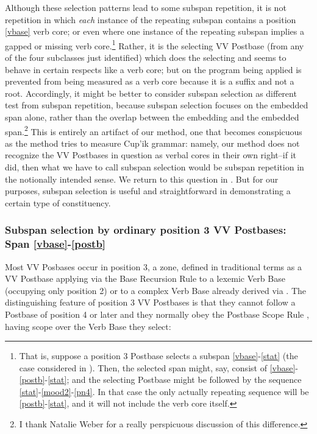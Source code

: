 \documentclass[output=paper]{langscibook}
\begin{document}
Although these selection patterns lead to some subspan repetition, it is not repetition in which \textit{each} instance of the repeating subspan contains a position \ref{vbase} verb core; or even where one instance of the repeating subspan implies a gapped or missing verb core.\footnote{That is, suppose a position 3 Postbase selects a subspan \ref{vbase}-\ref{stat} (the case considered in ). Then, the selected span might, say, consist of \ref{vbase}-\ref{postb}-\ref{stat}; and the selecting Postbase might be followed by the sequence \ref{stat}-\ref{mood2}-\ref{pn4}. In that case the only actually repeating sequence will be \ref{postb}-\ref{stat}, and it will not include the verb core itself.}  Rather, it is the selecting VV Postbase (from any of the four subclasses just identified) which does the selecting and seems to behave in certain respects like a verb core; but on the program being applied is prevented from being measured as a verb core because it is a suffix and not a root. Accordingly, it might be better to consider subspan selection as different test from subspan repetition, because subspan selection focuses on the embedded span alone, rather than the overlap between the embedding and the embedded span.\footnote{I thank Natalie Weber for a really perspicuous discussion of this difference.} This is entirely an artifact of our method, one that becomes conspicuous as the method tries to measure Cup'ik grammar: namely, our method does not recognize the VV Postbases in question as verbal cores in their own right--if it did, then what we have to call subspan selection would be subspan repetition in the notionally intended sense. We return to this question in . But for our purposes, subspan selection is useful and straightforward in demonstrating a certain type of constituency.


\subsubsection{Subspan selection by ordinary position 3 VV Postbases: Span \ref{vbase}-\ref{postb}} \label{sec:5.6.1}

Most VV Posbases occur in position 3, a zone, defined in traditional terms as a VV Postbase applying via the Base Recursion Rule  to a lexemic Verb Base (occupying only position 2) or to a complex Verb Base already derived via . The distinguishing feature of position 3 VV Postbases is that they cannot follow a Postbase of position 4 or later and they normally obey the Postbase Scope Rule , having scope over the Verb Base they select:
\end{document}

